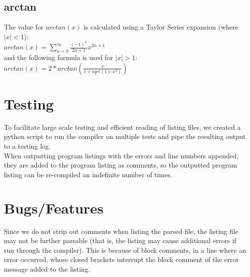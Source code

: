 \documentclass{report}
\begin{document}
\subsection*{arctan}
The value for $arctan(x)$ is calculated using a Taylor Series expansion (where $|x| < 1 $): \\
$ arctan(x) = \displaystyle\sum_{n=0}^{\infty} \frac{(-1)^n}{2n+1} x^{2n+1} $ \\
and the following formula is used for $|x| >1$:\\
$arctan(x) = 2 * arctan(\frac{x}{1+sqrt(1+x^2)})$

\section*{Testing}
To facilitate large scale testing and efficient reading of listing files, we created a python script to run the compiler on multiple tests and pipe the resulting output to a testing log.\\
When outputting program listings with the errors and line numbers appended, they are added to the program listing as comments, so the outputted program listing can be re-compiled an indefinite number of times.


\section*{Bugs/Features}
Since we do not strip out comments when listing the parsed file, the listing file may not be further parsable (that is, the listing may cause additional errors if run through the compiler). This is because of block comments, in a line where an error occurred, whose closed brackets interrupt the block comment of the error message added to the listing.
\end{document}
